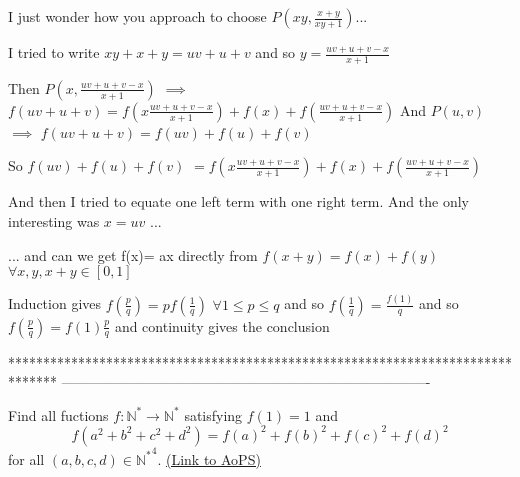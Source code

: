 \begin{solution}
	\begin{tcolorbox} I just wonder how you approach to choose $ P(xy,\frac {x + y}{xy + 1})$...\end{tcolorbox}

I tried to write $ xy+x+y=uv+u+v$ and so $ y=\frac{uv+u+v-x}{x+1}$

Then $ P(x,\frac{uv+u+v-x}{x+1})$ $ \implies$ $ f(uv+u+v)=f(x\frac{uv+u+v-x}{x+1})+f(x)+f(\frac{uv+u+v-x}{x+1})$
And $ P(u,v)$ $ \implies$ $ f(uv+u+v)=f(uv)+f(u)+f(v)$

So $ f(uv)+f(u)+f(v)$ $ =f(x\frac{uv+u+v-x}{x+1})+f(x)+f(\frac{uv+u+v-x}{x+1})$

And then I tried to equate one left term with one right term. And the only interesting was $ x=uv$ ...

\begin{tcolorbox} ... and can we get f(x)= ax directly from $ f(x + y) = f(x) + f(y)$$ \forall x,y,x + y\in[0,1]$\end{tcolorbox}

Induction gives $ f(\frac pq)=pf(\frac 1q)$ $ \forall 1\le p\le q$ and so $ f(\frac 1q)=\frac{f(1)}q$ and so $ f(\frac pq)=f(1)\frac pq$ and continuity gives the conclusion
\end{solution}
*******************************************************************************
-------------------------------------------------------------------------------

\begin{problem}
	Find all fuctions $ f: \mathbb{N^{*}} \longrightarrow \mathbb{N^*}$ satisfying $f(1)=1$ and 
\[f(a^2+b^2+c^2+d^2)=f(a)^2+f(b)^2+f(c)^2+f(d)^2\]
for all $(a,b,c,d) \in \mathbb{N^*}^4$.
	\flushright \href{https://artofproblemsolving.com/community/c6h314704}{(Link to AoPS)}
\end{problem}



